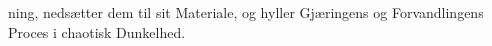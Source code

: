 \documentclass[12pt]{book}
\begin{document}
ning, nedsætter dem til sit Materiale, og hyller Gjæringens og Forvandlingens Proces i chaotisk
Dunkelhed.
\end{document}
